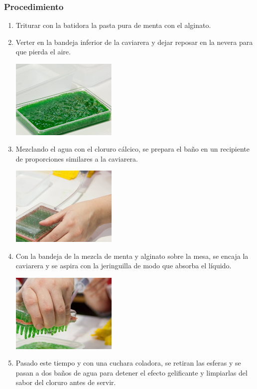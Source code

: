 \documentclass{scrartcl}
\begin{document}
	\subsubsection{Procedimiento \cite{maite}}
	\begin{multicols}{2}
		\begin{enumerate}
			\item Triturar con la batidora la pasta pura de menta con el alginato.  
			\item Verter en la bandeja inferior de la caviarera y dejar reposar en la nevera para que pierda el aire.
			\begin{center}
				\includegraphics[width = 0.4\textwidth]{images/caviar1}
			\end{center}
		
			\item Mezclando el agua con el cloruro cálcico, se prepara el baño en un recipiente de proporciones similares a la caviarera.
			\begin{center}
				\includegraphics[width = 0.4\textwidth]{images/caviar2}
			\end{center}
		
			\item Con la bandeja de la mezcla de menta y alginato sobre la mesa, se encaja la caviarera y se aspira con la jeringuilla de modo que absorba el líquido.
			\begin{center}
				\includegraphics[width = 0.4\textwidth]{images/caviar3}
			\end{center}
		
			\item Pasado este tiempo y con una cuchara coladora, se retiran las esferas y se pasan a dos baños de agua para detener el efecto gelificante y limpiarlas del sabor del cloruro antes de servir.
		\end{enumerate}
	\end{multicols}
	\newpage
\end{document}
